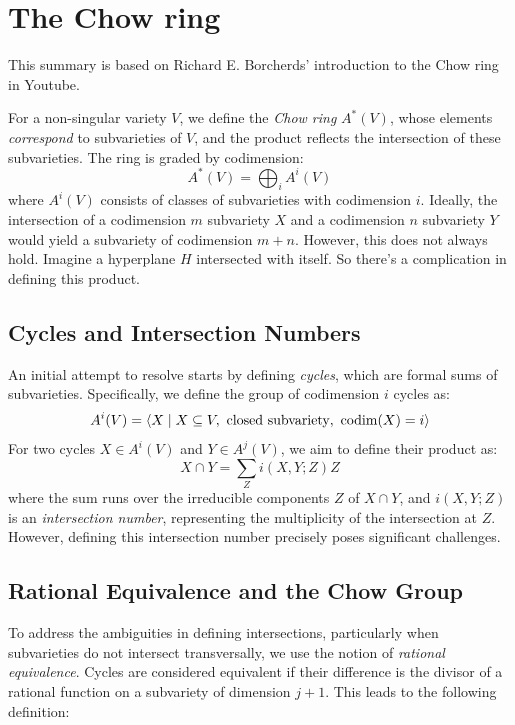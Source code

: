 \documentclass[12pt]{memoir}
\begin{document}
\section{The Chow ring}

This summary is based on Richard E. Borcherds' introduction to the Chow ring in Youtube.

For a non-singular variety \( V \), we define the \emph{Chow ring} \( A^\ast(V) \), whose elements \emph{correspond} to subvarieties of \( V \), and the product reflects the intersection of these subvarieties. The ring is graded by codimension:
\[
A^\ast(V) = \bigoplus_i A^i(V)
\]
where \( A^i(V) \) consists of classes of subvarieties with codimension \( i \). Ideally, the intersection of a codimension \( m \) subvariety \( X \) and a codimension \( n \) subvariety \( Y \) would yield a subvariety of codimension \( m+n \). However, this does not always hold. Imagine a hyperplane $H$ intersected with itself. So there's a complication in defining this product.

\subsection{Cycles and Intersection Numbers}

An initial attempt to resolve starts by defining \emph{cycles}, which are formal sums of subvarieties. Specifically, we define the group of codimension \( i \) cycles as:
\[
A^i(V) = \left\langle X \mid X \subseteq V, \ \text{closed subvariety}, \ \codim(X) = i \right\rangle
\]
For two cycles \( X \in A^i(V) \) and \( Y \in A^j(V) \), we aim to define their product as:
\[
X \cap Y = \sum_{Z} i(X, Y; Z) Z
\]
where the sum runs over the irreducible components \( Z\) of \( X \cap Y \), and \( i(X, Y; Z) \) is an \emph{intersection number}, representing the multiplicity of the intersection at \( Z \). However, defining this intersection number precisely poses significant challenges.

\subsection{Rational Equivalence and the Chow Group}

To address the ambiguities in defining intersections, particularly when subvarieties do not intersect transversally, we use the notion of \emph{rational equivalence}. Cycles are considered equivalent if their difference is the divisor of a rational function on a subvariety of dimension \( j+1 \). This leads to the following definition:
\end{document}
